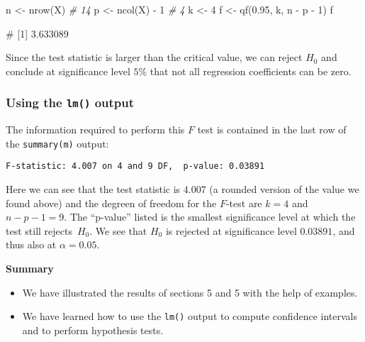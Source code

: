 \documentclass[
  a4paper,
]{article}
\newenvironment{Shaded}{\begin{snugshade}}{\end{snugshade}}
\newcommand{\CommentTok}[1]{\textcolor[rgb]{0.56,0.35,0.01}{\textit{#1}}}
\newcommand{\DecValTok}[1]{\textcolor[rgb]{0.00,0.00,0.81}{#1}}
\newcommand{\FloatTok}[1]{\textcolor[rgb]{0.00,0.00,0.81}{#1}}
\newcommand{\FunctionTok}[1]{\textcolor[rgb]{0.00,0.00,0.00}{#1}}
\newcommand{\NormalTok}[1]{#1}
\newcommand{\OtherTok}[1]{\textcolor[rgb]{0.56,0.35,0.01}{#1}}
\newcommand{\SpecialCharTok}[1]{\textcolor[rgb]{0.00,0.00,0.00}{#1}}
\providecommand{\tightlist}{%
  \setlength{\itemsep}{0pt}\setlength{\parskip}{0pt}}
\theoremstyle{definition}
\theoremstyle{definition}
\theoremstyle{definition}
\theoremstyle{definition}
\theoremstyle{remark}
\begin{document}
\begin{Shaded}
\begin{Highlighting}[]
\NormalTok{n }\OtherTok{\textless{}{-}} \FunctionTok{nrow}\NormalTok{(X)      }\CommentTok{\# 14}
\NormalTok{p }\OtherTok{\textless{}{-}} \FunctionTok{ncol}\NormalTok{(X) }\SpecialCharTok{{-}} \DecValTok{1}  \CommentTok{\# 4}
\NormalTok{k }\OtherTok{\textless{}{-}} \DecValTok{4}
\NormalTok{f }\OtherTok{\textless{}{-}} \FunctionTok{qf}\NormalTok{(}\FloatTok{0.95}\NormalTok{, k, n }\SpecialCharTok{{-}}\NormalTok{ p }\SpecialCharTok{{-}} \DecValTok{1}\NormalTok{)}
\NormalTok{f}
\end{Highlighting}
\end{Shaded}

\begin{Shaded}
\begin{Highlighting}[]
\NormalTok{\# [1] 3.633089}
\end{Highlighting}
\end{Shaded}

Since the test statistic is larger than the critical value, we can
reject \(H_0\) and conclude at significance level \(5\%\) that not
all regression coefficients can be zero.

\hypertarget{using-the-lm-output}{%
\subsubsection{\texorpdfstring{Using the \texttt{lm()} output}{Using the lm() output}}\label{using-the-lm-output}}

The information required to perform this \(F\) test is contained
in the last row of the \texttt{summary(m)} output:

\begin{verbatim}
F-statistic: 4.007 on 4 and 9 DF,  p-value: 0.03891
\end{verbatim}

Here we can see that the test statistic is \(4.007\) (a rounded version
of the value we found above) and the degreen of freedom for the \(F\)-test
are \(k = 4\) and \(n - p - 1 = 9\). The ``p-value'' listed is the smallest
significance level at which the test still rejects~\(H_0\).
We see that \(H_0\) is rejected at significance level \(0.03891\),
and thus also at \(\alpha=0.05\).

\textbf{Summary}

\begin{itemize}
\tightlist
\item
  We have illustrated the results of sections 5 and 5 with the help
  of examples.
\item
  We have learned how to use the \texttt{lm()} output to compute confidence
  intervals and to perform hypothesis tests.
\end{itemize}
\end{document}
